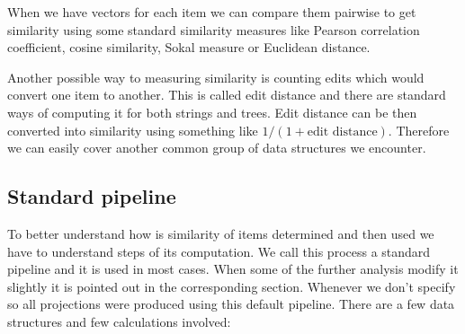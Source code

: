\documentclass[
  digital, %
  table,   %
  nolof,     %
  nolot,     %
  nocover,
  color
]{fithesis3}
\begin{document}
When we have vectors for each item we can compare them pairwise to get similarity using some standard similarity measures like Pearson correlation coefficient, cosine similarity, Sokal measure or Euclidean distance.


Another possible way to measuring similarity is counting edits which would convert one item to another. This is called edit distance and there are standard ways of computing it for both strings and trees. Edit distance can be then converted into similarity using something like $1 / (1 + \text{edit distance})$. Therefore we can easily cover another common group of data structures we encounter.


\subsection{Standard pipeline}\label{standard-pipeline}


To better understand how is similarity of items determined and then used we have to understand steps of its computation. We call this process a standard pipeline and it is used in most cases. When some of the further analysis modify it slightly it is pointed out in the corresponding section. Whenever we don't specify so all projections were produced using this default pipeline. There are a few data structures and few calculations involved:
\end{document}
